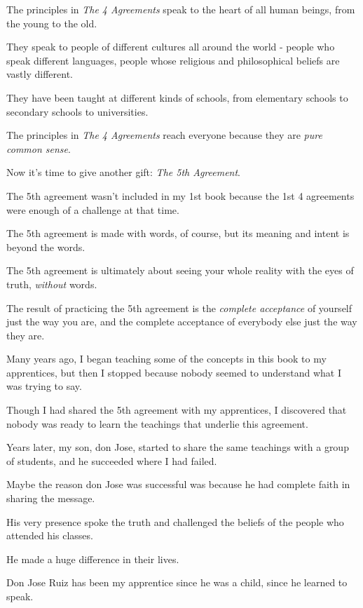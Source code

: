 \documentclass{article}
\numberwithin{equation}{section}
\begin{document}
%
The principles in \textit{The 4 Agreements} speak to the heart of all human beings, from the young to the old.

They speak to people of different cultures all around the world - people who speak different languages, people whose religious and philosophical beliefs are vastly different.

They have been taught at different kinds of schools, from elementary schools to secondary schools to universities.

The principles in \textit{The 4 Agreements} reach everyone because they are \textit{pure common sense}.

%
Now it's time to give another gift: \textit{The 5th Agreement}.

The 5th agreement wasn't included in my 1st book because the 1st 4 agreements were enough of a challenge at that time.

The 5th agreement is made with words, of course, but its meaning and intent is beyond the words.

The 5th agreement is ultimately about seeing your whole reality with the eyes of truth, \textit{without} words.

The result of practicing the 5th agreement is the \textit{complete acceptance} of yourself just the way you are, and the complete acceptance of everybody else just the way they are.


%
Many years ago, I began teaching some of the concepts in this book to my apprentices, but then I stopped because nobody seemed to understand what I was trying to say.

Though I had shared the 5th agreement with my apprentices, I discovered that nobody was ready to learn the teachings that underlie this agreement.

Years later, my son, don Jose, started to share the same teachings with a group of students, and he succeeded where I had failed.

Maybe the reason don Jose was successful was because he had complete faith in sharing the message.

His very presence spoke the truth and challenged the beliefs of the people who attended his classes.

He made a huge difference in their lives.

%
Don Jose Ruiz has been my apprentice since he was a child, since he learned to speak.
\end{document}
